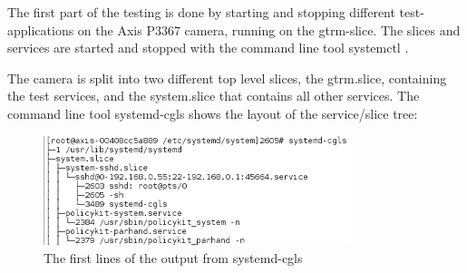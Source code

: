 \documentclass[nobiblatex]{LTHthesis}
\begin{document}

The first part of the testing is done by starting and stopping different test-applications on the Axis P3367 camera, running on the gtrm-slice.
The slices and services are started and stopped with the command line tool systemctl \cite{systemctl}.

The camera is split into two different top level slices, the gtrm.slice, containing the test services, and the system.slice that contains all other services. The command line tool systemd-cgls shows the layout of the service/slice tree:



\begin{figure}[h]
    \centering
    \includegraphics[width=0.8\textwidth]{systemd-cgls2}
    \caption{The first lines of the output from  systemd-cgls}
    \label{fig:systemd-cgls2}
\end{figure}
\end{document}

